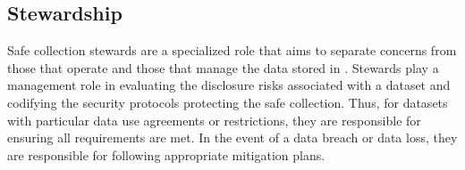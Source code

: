 %
%

\subsection{Stewardship}


Safe collection stewards are a specialized role that aims to separate
concerns from those that operate \NAME and those that manage the data stored in \NAMENS.
Stewards play a management role in evaluating the disclosure risks associated with a
dataset and codifying the security protocols protecting the safe collection.
Thus, for datasets with particular data use agreements or restrictions, they 
are responsible for ensuring all requirements are met. In the event of a
data breach or data loss, they are responsible for following appropriate
mitigation plans.

